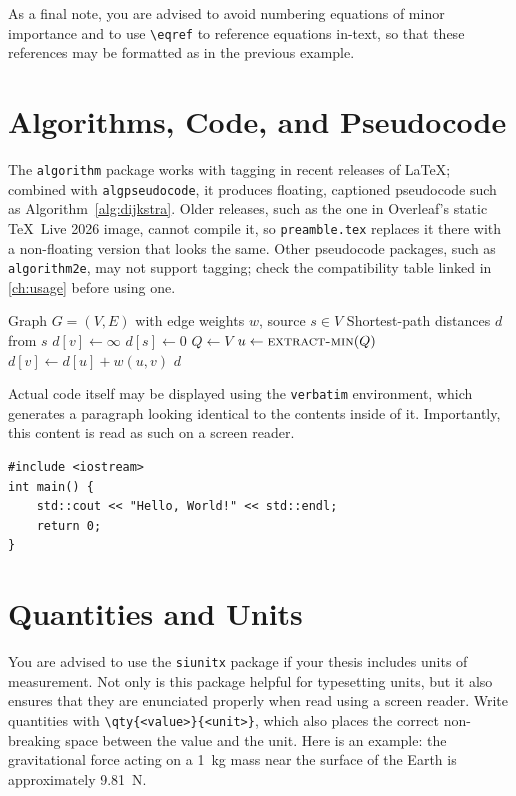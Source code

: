 As a final note, you are advised to avoid numbering equations of minor importance and to use \verb|\eqref| to reference equations in-text, so that these references may be formatted as in the previous example.

\section{Algorithms, Code, and Pseudocode}
The \texttt{algorithm} package works with tagging in recent releases of \LaTeX; combined with \texttt{algpseudocode}, it produces floating, captioned pseudocode such as Algorithm~\ref{alg:dijkstra}.
Older releases, such as the one in Overleaf's static \TeX\ Live 2026 image, cannot compile it, so \texttt{preamble.tex} replaces it there with a non-floating version that looks the same.
Other pseudocode packages, such as \texttt{algorithm2e}, may not support tagging; check the compatibility table linked in \autoref{ch:usage} before using one.

\begin{algorithm}
  \caption{Dijkstra's algorithm}\label{alg:dijkstra}
  \begin{algorithmic}[1]
    \Require Graph \(G = (V, E)\) with edge weights \(w\), source \(s \in V\)
    \Ensure Shortest-path distances \(d\) from \(s\)
        \State \(d[v] \gets \infty\)
      \EndFor
      \State \(d[s] \gets 0\)
      \State \(Q \gets V\) 
        \State \(u \gets \Call{extract-min}{Q}\)
            \State \(d[v] \gets d[u] + w(u, v)\)
          \EndIf
        \EndFor
      \EndWhile
      \State \Return \(d\)
    \EndProcedure
  \end{algorithmic}
\end{algorithm}

Actual code itself may be displayed using the \texttt{verbatim} environment, which generates a paragraph looking identical to the contents inside of it.
Importantly, this content is read as such on a screen reader.
\begin{verbatim}
#include <iostream>
int main() {
    std::cout << "Hello, World!" << std::endl;
    return 0;
}
\end{verbatim}

\section{Quantities and Units}
You are advised to use the \texttt{siunitx} package if your thesis includes units of measurement.
Not only is this package helpful for typesetting units, but it also ensures that they are enunciated properly when read using a screen reader.
Write quantities with \verb|\qty{<value>}{<unit>}|, which also places the correct non-breaking space between the value and the unit.
Here is an example: the gravitational force acting on a \qty{1}{\kilo\gram} mass near the surface of the Earth is approximately \qty{9.81}{\newton}.

